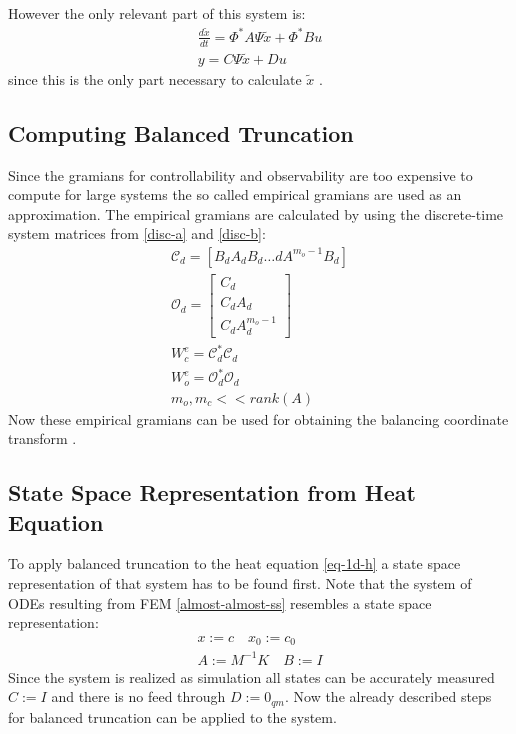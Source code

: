 However the only relevant part of this system is:
\begin{gather}
\frac{d\tilde{x}}{dt} = \Phi^{*}A\Psi\tilde{x} + \Phi^{*}Bu \\
y = C\Psi\tilde{x} + Du 
\end{gather}
since this is the only part necessary to calculate \(\tilde{x}\)
\cite{brunton_kutz_2019e}.

\subsection{Computing Balanced Truncation}
Since the gramians for controllability and observability are too expensive to compute for large systems the so called empirical gramians are used as an approximation.
The empirical gramians are calculated by using the discrete-time system matrices from \ref{disc-a} and \ref{disc-b}:
\begin{gather}
\mathscr{C}_d = [B_d A_dB_d \hdots dA^{m_o -1}B_d] \\
\mathscr{O}_d = \begin{bmatrix}
C_d \\
C_dA_d \\
C_dA_d^{m_o - 1}
\end{bmatrix} \\
W_c^e = \mathscr{C}_d^{*}\mathscr{C}_d \\
W_o^e = \mathscr{O}_d^{*}\mathscr{O}_d \\
m_o, m_c << rank(A)
\end{gather}
Now these empirical gramians can be used for obtaining the balancing coordinate transform \cite{brunton_kutz_2019e}.

\subsection{State Space Representation from Heat Equation} \label{heat-ss}
To apply balanced truncation to the heat equation \ref{eq-1d-h} a state space representation of that system has to be found first.
Note that the system of ODEs resulting from FEM \ref{almost-almost-ss} resembles a state space representation:
\begin{gather}
x := c \quad x_0 := c_0 \\
A := M^{-1}K \quad B:= I
\end{gather}
Since the system is realized as simulation all states can be accurately measured \(C := I\) and there is no feed through \(D := 0_{qm}\).
Now the already described steps for balanced truncation can be applied to the system.

